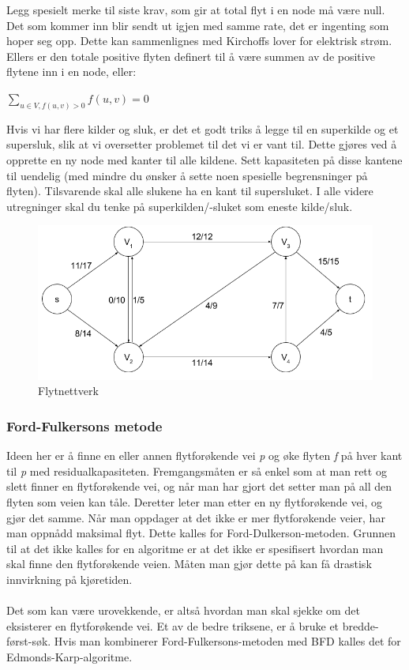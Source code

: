 \noindent Legg spesielt merke til siste krav, som gir at total flyt i en node må være null. Det som kommer inn blir sendt ut igjen med samme rate, det er ingenting som hoper seg opp. Dette kan sammenlignes med Kirchoffs lover for elektrisk strøm. Ellers er den totale positive flyten definert til å være summen av de positive flytene inn i en node, eller:
\begin{center}
    $\sum\limits_{u \in V, f(u,v)>0} f(u,v) = 0$ 
    \end{center}
    
\noindent Hvis vi har flere kilder og sluk, er det et godt triks å legge til en superkilde og et supersluk, slik at vi oversetter problemet til det vi er vant til. Dette gjøres ved å opprette en ny node med kanter til alle kildene. Sett kapasiteten på disse kantene til uendelig (med mindre du ønsker å sette noen spesielle begrensninger på flyten). Tilsvarende skal alle slukene ha en kant til supersluket. I alle videre utregninger skal du tenke på superkilden/-sluket som eneste kilde/sluk.

\begin{figure}[H]
\includegraphics[scale=0.6]{images/flytnettverk}
\centering %
\caption{Flytnettverk}
\label{fig:flytnettverk}
\end{figure}

\subsubsection{Ford-Fulkersons metode}
Ideen her er å finne en eller annen flytforøkende vei \textit{p} og øke flyten \textit{f} på hver kant til \textit{p} med residualkapasiteten. Fremgangsmåten er så enkel som at man rett og slett finner en flytforøkende vei, og når man har gjort det setter man på all den flyten som veien kan tåle. Deretter leter man etter en ny flytforøkende vei, og gjør det samme. Når man oppdager at det ikke er mer flytforøkende veier, har man oppnådd maksimal flyt. Dette kalles for Ford-Dulkerson-metoden. Grunnen til at det ikke kalles for en algoritme er at det ikke er spesifisert hvordan man skal finne den flytforøkende veien. Måten man gjør dette på kan få drastisk innvirkning på kjøretiden.
\\\\
Det som kan være urovekkende, er altså hvordan man skal sjekke om det eksisterer en flytforøkende vei. Et av de bedre triksene, er å bruke et bredde-først-søk. Hvis man kombinerer Ford-Fulkersons-metoden med BFD kalles det for Edmonds-Karp-algoritme.

